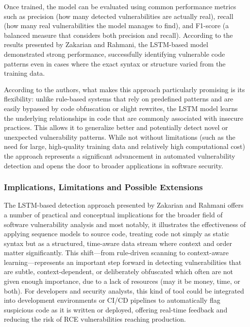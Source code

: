 \documentclass[a4paper]{usiinfbachelorproject}
\begin{document}
Once trained, the model can be evaluated using common performance metrics such as precision (how many detected vulnerabilities are actually real), recall (how many real vulnerabilities the model manages to find), and F1-score (a balanced measure that considers both precision and recall). According to the results presented by Zakarian and Rahmani, the LSTM-based model demonstrated strong performance, successfully identifying vulnerable code patterns even in cases where the exact syntax or structure varied from the training data.

According to the authors, what makes this approach particularly promising is its flexibility: unlike rule-based systems that rely on predefined patterns and are easily bypassed by code obfuscation or slight rewrites, the LSTM model learns the underlying relationships in code that are commonly associated with insecure practices. This allows it to generalize better and potentially detect novel or unexpected vulnerability patterns. While not without limitations (such as the need for large, high-quality training data and relatively high computational cost) the approach represents a significant advancement in automated vulnerability detection and opens the door to broader applications in software security.

\subsubsection{Implications, Limitations and Possible Extensions}

The LSTM-based detection approach presented by Zakarian and Rahmani offers a number of practical and conceptual implications for the broader field of software vulnerability analysis and most notably, it illustrates the effectiveness of applying sequence models to source code, treating code not simply as static syntax but as a structured, time-aware data stream where context and order matter significantly. This shift—from rule-driven scanning to context-aware learning—represents an important step forward in detecting vulnerabilities that are subtle, context-dependent, or deliberately obfuscated which often are not given enough importance, due to a lack of resources (may it be money, time, or both). For developers and security analysts, this kind of tool could be integrated into development environments or CI/CD pipelines to automatically flag suspicious code as it is written or deployed, offering real-time feedback and reducing the risk of RCE vulnerabilities reaching production.
\end{document}
